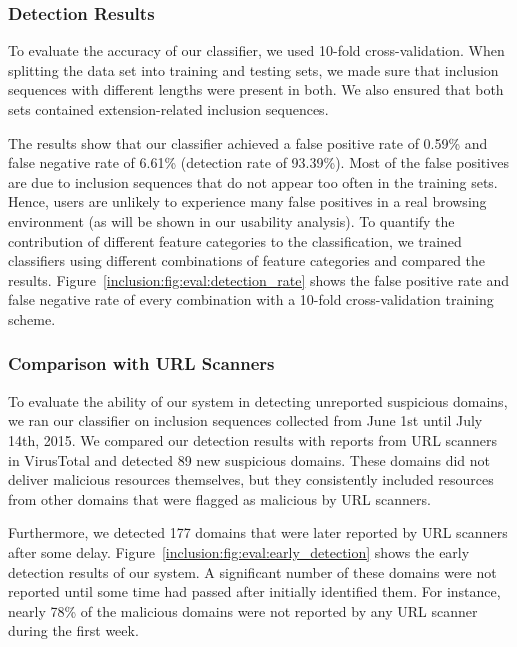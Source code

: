 \subsubsection{Detection Results}
\label{inclusion:sec:detection_results}



To evaluate the accuracy of our classifier, we used 10-fold cross-validation.
When splitting the data set into training and testing sets, we made sure that
inclusion sequences with different lengths were present in both. We also ensured
that both sets contained extension-related inclusion sequences.

The results show that our classifier achieved a false positive rate of 0.59\%
and false negative rate of 6.61\% (detection rate of 93.39\%). Most of the false
positives are due to inclusion sequences that do not appear too often in the
training sets. Hence, users are unlikely to experience many false positives in a
real browsing environment (as will be shown in our usability analysis). To
quantify the contribution of different feature categories to the classification,
we trained classifiers using different combinations of feature categories and
compared the results. Figure~\ref{inclusion:fig:eval:detection_rate} shows the
false positive rate and false negative rate of every combination with a 10-fold
cross-validation training scheme.

\subsubsection{Comparison with URL Scanners}
\label{inclusion:sec:comparison}

To evaluate the ability of our system in detecting unreported suspicious
domains, we ran our classifier on inclusion sequences collected from June 1st
until July 14th, 2015. We compared our detection results with reports from URL
scanners in VirusTotal and detected 89 new suspicious domains. These domains did
not deliver malicious resources themselves, but they consistently included
resources from other domains that were flagged as malicious by URL scanners.

Furthermore, we detected 177 domains that were later reported by URL scanners
after some delay. Figure~\ref{inclusion:fig:eval:early_detection} shows the
early detection results of our system. A significant number of these domains
were not reported until some time had passed after \excision initially
identified them. For instance, nearly 78\% of the malicious domains were not
reported by any URL scanner during the first week.

